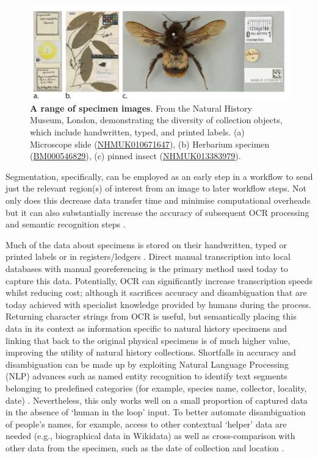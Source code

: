 \begin{figure}%
  \includegraphics[width=\textwidth]{figures/ch08/figure1.png}
	\caption[A range of specimen images]{\textbf{A range of specimen images}. From the Natural History Museum, London, demonstrating the
  diversity of collection objects, which include handwritten, typed, and
  printed labels. (a) Microscope slide
  (\href{https://data.nhm.ac.uk/object/c65d9a3c-d8f6-4fac-a418-05c3b697cece}{NHMUK010671647}),
  (b) Herbarium specimen
  (\href{https://data.nhm.ac.uk/object/be595f07-73c5-4764-a96c-8b377e3d1507}{BM000546829}),
  (c) pinned insect
  (\href{https://data.nhm.ac.uk/object/745febc7-8222-498a-9969-5f6b12f85ef3}{NHMUK013383979}).}
  \label{ch8:figure1}
\end{figure}


Segmentation, specifically, can be employed as an early step in a
workflow to send just the relevant region(s) of interest from an image
to later workflow steps. Not only does this decrease data transfer time
and minimise computational overheads but it can also substantially
increase the accuracy of subsequent OCR processing and semantic
recognition steps \cite{ch8-18}.

Much of the data about specimens is stored on their handwritten, typed
or printed labels or in registers/ledgers \cite{ch8-34}. Direct manual
transcription into local databases with manual georeferencing is the
primary method used today to capture this data. Potentially, OCR can
significantly increase transcription speeds whilst reducing cost;
although it sacrifices accuracy and disambiguation that are today
achieved with specialist knowledge provided by humans during the
process. Returning character strings from OCR is useful, but
semantically placing this data in its context as information specific to
natural history specimens and linking that back to the original physical
specimens is of much higher value, improving the utility of natural
history collections. Shortfalls in accuracy and disambiguation can be
made up by exploiting Natural Language Processing (NLP) advances such as
named entity recognition to identify text segments belonging to
predefined categories (for example, species name, collector, locality,
date) \cite{ch8-18}. Nevertheless, this only works well on a small proportion
of captured data in the absence of `human in the loop' input. To better
automate disambiguation of people's names, for example, access to other
contextual `helper' data are needed (e.g., biographical data in
Wikidata) as well as cross-comparison with other data from the specimen,
such as the date of collection and location \cite{ch8-35}.

